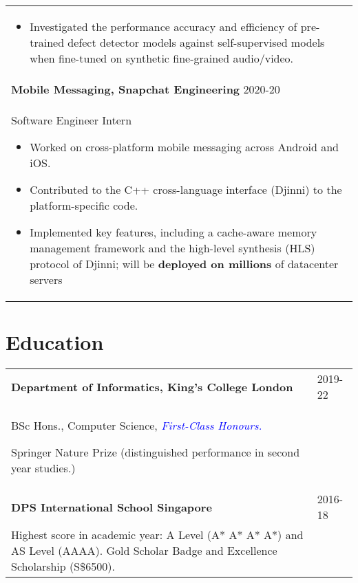 \documentclass[12pt,a4paper]{article}
\begin{document}
\begin{longtable}{p{\textwidth}}
\begin{itemize}[itemsep=-2mm,topsep=0pt,partopsep=0pt,leftmargin=5mm]
        \item Investigated the performance accuracy and efficiency of pre-trained defect detector models against self-supervised models when fine-tuned on synthetic fine-grained audio/video.
       \end{itemize} \\
\textbf{Mobile Messaging, Snapchat Engineering} \hfill \small{2020-20} \\
       Software Engineer Intern \vspace{1pt}
       \begin{itemize}[itemsep=-1mm,topsep=0pt,partopsep=0pt,leftmargin=5mm]
        \item Worked on cross-platform mobile messaging across Android and iOS.
        \item Contributed to the C++ cross-language interface (Djinni) to the platform-specific code.
        \item Implemented key features, including a cache-aware memory management framework and the high-level synthesis (HLS) protocol of Djinni; will be \textbf{deployed on millions} of datacenter servers
       \end{itemize}
\end{longtable}

\vspace{-6mm}

\section{Education}
\begin{longtable}{p{15cm}p{2cm}@{}}
\textbf{Department of Informatics, King's College London} & \small{2019-22} \\
         BSc Hons., Computer Science, \textit{\textcolor{blue}{First-Class Honours.}}

          \textcolor{YellowOrange}{Springer Nature Prize} (distinguished performance in second year studies.) \vspace{3mm} \\
\textbf{DPS International School Singapore} & \small{2016-18}  \\
         Highest score in academic year: A Level (A* A* A* A*) and AS Level (AAAA). Gold Scholar Badge and Excellence Scholarship (S\$6500).
\end{longtable}
\end{document}
